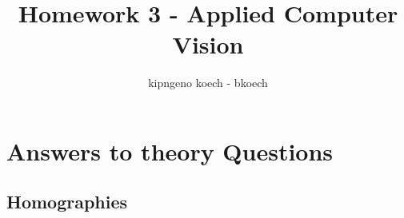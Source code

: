 \documentclass[a3paper,12pt]{extarticle} %
\begin{document}
\author{kipngeno koech - bkoech}
\title{Homework 3 - Applied Computer Vision}   
\maketitle

\medskip

\maketitle

\section{Answers to theory Questions}
\subsection{Homographies}
\end{document}
